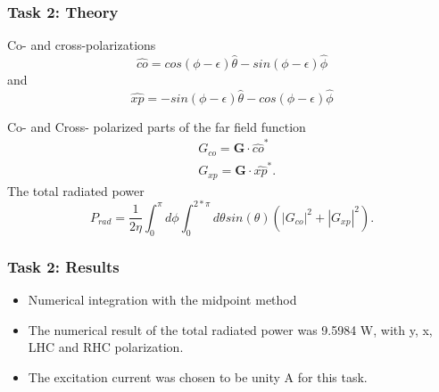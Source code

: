 \begin{frame}
\frametitle{Task 2: Theory}
Co- and cross-polarizations
\begin{equation}
\hat{co} = cos(\phi - \epsilon) \hat{\theta} - sin(\phi - \epsilon)\hat{\phi}
\end{equation} 
and
\begin{equation}
\hat{xp} = -sin(\phi - \epsilon) \hat{\theta} - cos(\phi - \epsilon)\hat{\phi}
\end{equation}

Co- and Cross- polarized parts of the far field function
\begin{align}
& G_{co}  = \mathbf{G}\cdot \hat{co}^* \\
& G_{xp}  = \mathbf{G}\cdot \hat{xp}^*.
\end{align}
The total radiated power 
\begin{equation}
P_{rad} =\frac{1}{2 \eta} \int_0^\pi d\phi \int_0^{2*\pi} d\theta sin(\theta)(|G_{co}|^2 + |G_{xp}|^2).
\end{equation}
\end{frame}


\begin{frame}
\frametitle{Task 2: Results}
\begin{itemize}
\item Numerical integration with the midpoint method

\item  The numerical result of the total radiated power was 9.5984 W, with y, x, LHC and RHC polarization. 
 
\item  The excitation current was chosen to be unity A for this task.
\end{itemize}
\end{frame}


